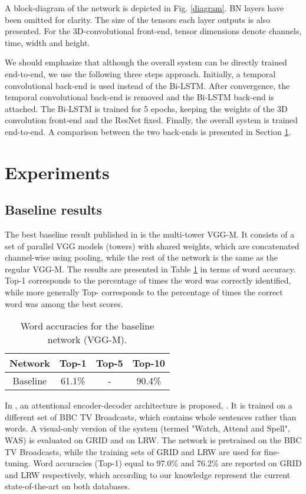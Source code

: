 \documentclass[a4paper]{article}
\begin{document}
A block-diagram of the network is depicted in Fig. \ref{diagram}. BN layers have been omitted for clarity. The size of the tensors each layer outputs is also presented. For the 3D-convolutional front-end, tensor dimensions denote channels, time, width and height. 

We should emphasize that although the overall system can be directly trained end-to-end, we use the following three steps approach. Initially, a temporal convolutional back-end is used instead of the Bi-LSTM. After convergence, the temporal convolutional back-end is removed and the Bi-LSTM back-end is attached. The Bi-LSTM is trained for 5 epochs, keeping the weights of the 3D convolution front-end and the ResNet fixed. Finally, the overall system is trained end-to-end. A comparison between the two back-ends is presented in Section \ref{Exper}.      

\section{Experiments}
\label{Exper}
\subsection{Baseline results}
The best baseline result published in \cite{chung2016lip} is the multi-tower VGG-M. It consists of a set of parallel VGG models (towers) with shared weights, which are concatenated channel-wise using pooling, while the rest of the network is the same as the regular VGG-M. The results are presented in Table \ref{baseline} in terms of word accuracy. Top-1 corresponds to the percentage of times the word was correctly identified, while more generally Top- corresponds to the percentage of times the correct word was among the  best scores.

\begin{table}[!htbp]
\centering
\begin{tabular}{| c || c | c | c |} 
\hline
Network & Top-1 & Top-5 & Top-10 \\ [0.5ex] 
\hline
Baseline & 61.1\% & - & 90.4\% \\ 
\hline
\end{tabular}
\vspace{1mm}\caption{Word accuracies for the baseline network (VGG-M).}\label{baseline}
\end{table}

In \cite{chung2016lipsent}, an attentional encoder-decoder architecture is proposed, \cite{xu2015show}. It is trained on a different set of BBC TV Broadcasts, which contains whole sentences rather than words. A visual-only version of the system (termed "Watch, Attend and Spell", WAS) is evaluated on GRID and on LRW. The network is pretrained on the BBC TV Broadcasts, while the training sets of GRID and LRW are used for fine-tuning. Word accuracies (Top-1) equal to 97.0\% and 76.2\% are reported on GRID and LRW respectively, which according to our knowledge represent the current state-of-the-art on both databases.
\end{document}
